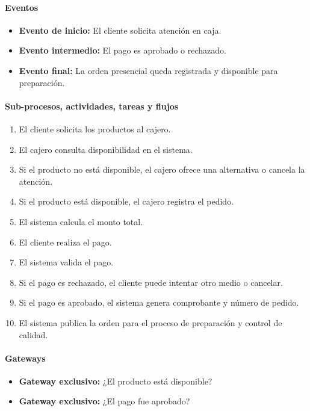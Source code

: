 \documentclass[a4paper,12pt]{article}
\begin{document}
\paragraph{Eventos}

\begin{itemize}
    \item \textbf{Evento de inicio:} El cliente solicita atención en caja.
    \item \textbf{Evento intermedio:} El pago es aprobado o rechazado.
    \item \textbf{Evento final:} La orden presencial queda registrada y disponible para preparación.
\end{itemize}

\paragraph{Sub-procesos, actividades, tareas y flujos}

\begin{enumerate}
    \item El cliente solicita los productos al cajero.
    \item El cajero consulta disponibilidad en el sistema.
    \item Si el producto no está disponible, el cajero ofrece una alternativa o cancela la atención.
    \item Si el producto está disponible, el cajero registra el pedido.
    \item El sistema calcula el monto total.
    \item El cliente realiza el pago.
    \item El sistema valida el pago.
    \item Si el pago es rechazado, el cliente puede intentar otro medio o cancelar.
    \item Si el pago es aprobado, el sistema genera comprobante y número de pedido.
    \item El sistema publica la orden para el proceso de preparación y control de calidad.
\end{enumerate}

\paragraph{Gateways}

\begin{itemize}
    \item \textbf{Gateway exclusivo:} ¿El producto está disponible?
    \item \textbf{Gateway exclusivo:} ¿El pago fue aprobado?
\end{itemize}
\end{document}
